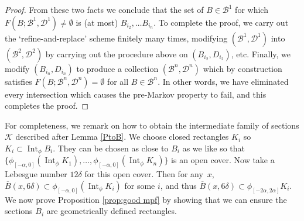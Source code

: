 \documentclass[JEP,XML,SOM,Unicode,NoFloatCountersInSection]{cedram}
\let\mathcal\mathscr
\theoremstyle{definition}
\numberwithin{equation}{section}
\DeclareMathOperator{\Int}{Int}
\newcommand\KKK{\mathcal K}
\newcommand\BBB{\mathcal B}
\begin{document}
\begin{proof}
From these two facts we conclude that the set of $B\!\in\!\mathcal{B}^1$ for which \hbox{$F(B;\mathcal{B}^1,\mathcal{D}^1)\!\neq\!\emptyset$} is (at most) $B_{i_2}, \ldots B_{i_n}$. To complete the proof, we carry out the `refine-and-replace' scheme finitely many times, modifying $(\mathcal{B}^1, \mathcal{D}^1)$ into $(\mathcal{B}^2, \mathcal{D}^2)$ by carrying out the procedure above on $(B_{i_2}, D_{i_2})$, etc. Finally, we modify $(B_{i_n}, D_{i_n})$ to produce a collection $(\mathcal{B}^n, \mathcal{D}^n)$ which by construction satisfies $F(B; \mathcal{B}^n,\mathcal{D}^n) = \emptyset$ for all $B \in \BBB^n$. In other words, we have eliminated every intersection which causes the pre-Markov property to fail, and this completes the proof.
\end{proof}

For completeness, we remark on how to obtain the intermediate family of sections $\KKK$ described after Lemma \ref{PtoB}. We choose closed rectangles $K_i$ so $K_i \subset \Int_\phi B_i$. They can be chosen as close to $B_i$ as we like so that $\{\phi_{[-\alpha, 0]} (\Int_\phi K_1), \ldots, \phi_{[-\alpha, 0]} (\Int_\phi K_n)\}$ is an open cover. Now take a Lebesgue number $12 \delta$ for this open cover. Then for any~$x$, $\overline B(x, 6\delta) \subset \phi_{[-\alpha, 0]} (\Int_\phi K_i)$ for some $i$, and thus $\overline B(x, 6\delta) \subset \phi_{[-2 \alpha, 2 \alpha]}K_i$. We now prove Proposition \ref{prop:good mpf} by showing that we can ensure the sections $B_i$ are geometrically defined rectangles.
\end{document}
